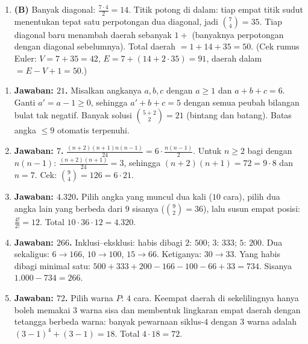 \documentclass[a4paper,11pt]{article}
\newcounter{no}
\begin{document}
\begin{enumerate}[leftmargin=2em,itemsep=2pt,topsep=2pt]
\item[\textbf{20.}] \textbf{(B)} Banyak diagonal: $\frac{7\cdot4}2=14$. Titik potong di dalam: tiap empat titik sudut menentukan tepat satu perpotongan dua diagonal, jadi $\binom74=35$. Tiap diagonal baru menambah daerah sebanyak $1+$ (banyaknya perpotongan dengan diagonal sebelumnya). Total daerah $=1+14+35=50$. (Cek rumus Euler: $V=7+35=42$, $E=7+(14+2\cdot35)=91$, daerah dalam $=E-V+1=50$.)
\end{enumerate}
\par{}\par\vspace{0.2em}
\small\begin{enumerate}[leftmargin=2em,itemsep=2pt,topsep=2pt]
\item[\textbf{1.}] \textbf{Jawaban: $21$.} Misalkan angkanya $a,b,c$ dengan $a\ge1$ dan $a+b+c=6$. Ganti $a'=a-1\ge0$, sehingga $a'+b+c=5$ dengan semua peubah bilangan bulat tak negatif. Banyak solusi $\binom{5+2}2=21$ (bintang dan batang). Batas angka $\le9$ otomatis terpenuhi.
\item[\textbf{2.}] \textbf{Jawaban: $7$.} $\frac{(n+2)(n+1)n(n-1)}{24}=6\cdot\frac{n(n-1)}2$. Untuk $n\ge2$ bagi dengan $n(n-1)$: $\frac{(n+2)(n+1)}{24}=3$, sehingga $(n+2)(n+1)=72=9\cdot8$ dan $n=7$. Cek: $\binom94=126=6\cdot21$.
\item[\textbf{3.}] \textbf{Jawaban: $4.320$.} Pilih angka yang muncul dua kali ($10$ cara), pilih dua angka lain yang berbeda dari $9$ sisanya ($\binom92=36$), lalu susun empat posisi: $\frac{4!}{2!}=12$. Total $10\cdot36\cdot12=4.320$.
\item[\textbf{4.}] \textbf{Jawaban: $266$.} Inklusi--eksklusi: habis dibagi $2$: $500$; $3$: $333$; $5$: $200$. Dua sekaligus: $6\to166$, $10\to100$, $15\to66$. Ketiganya: $30\to33$. Yang habis dibagi minimal satu: $500+333+200-166-100-66+33=734$. Sisanya $1.000-734=266$.
\item[\textbf{5.}] \textbf{Jawaban: $72$.} Pilih warna $P$: $4$ cara. Keempat daerah di sekelilingnya hanya boleh memakai $3$ warna sisa dan membentuk lingkaran empat daerah dengan tetangga berbeda warna: banyak pewarnaan siklus-$4$ dengan $3$ warna adalah $(3-1)^4+(3-1)=18$. Total $4\cdot18=72$.
\end{enumerate}
\par{}\par\vspace{0.2em}
\end{document}
